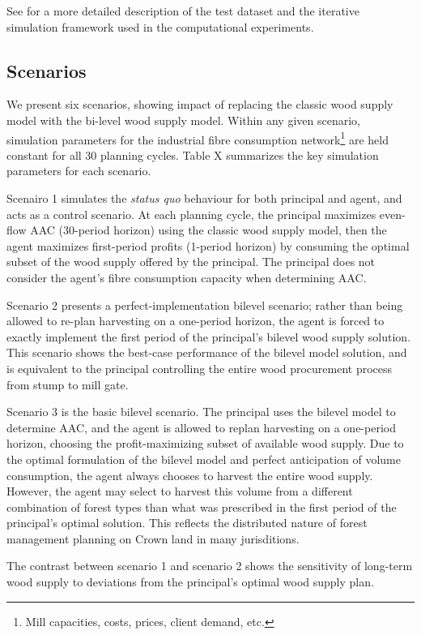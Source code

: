 See \citet{paradis2013risk} for a more detailed description of the test dataset and the iterative simulation framework used in the computational experiments.

\subsection{Scenarios}

We present six scenarios, showing impact of replacing the classic wood supply model with the bi-level wood supply model. Within any given scenario, simulation parameters for the industrial fibre consumption network\footnote{Mill capacities, costs, prices, client demand, etc.} are held constant for all 30 planning cycles. Table X summarizes the key simulation parameters for each scenario. 


Scenairo 1 simulates the \emph{status quo} behaviour for both principal and agent, and acts as a control scenario. At each planning cycle, the principal maximizes even-flow AAC (30-period horizon) using the classic wood supply model, then the agent maximizes first-period profits (1-period horizon) by consuming the optimal subset of the wood supply offered by the principal. The principal does not consider the agent's fibre consumption capacity when determining AAC. 

Scenario 2 presents a perfect-implementation bilevel scenario; rather than being allowed to re-plan harvesting on a one-period horizon, the agent is forced to exactly implement the first period of the principal's bilevel wood supply solution. This scenario shows the best-case performance of the bilevel model solution, and is equivalent to the principal controlling the entire wood procurement process from stump to mill gate.

Scenario 3 is the basic bilevel scenario. The principal uses the bilevel model to determine AAC, and the agent is allowed to replan harvesting on a one-period horizon, choosing the profit-maximizing subset of available wood supply. Due to the optimal formulation of the bilevel model and perfect anticipation of volume consumption, the agent always chooses to harvest the entire wood supply. However, the agent may select to harvest this volume from a different combination of forest types than what was prescribed in the first period of the principal's optimal solution. This reflects the distributed nature of forest management planning on Crown land in many jurisditions.

The contrast between scenario 1 and scenario 2 shows the sensitivity of long-term wood supply to deviations from the principal's optimal wood supply plan.

